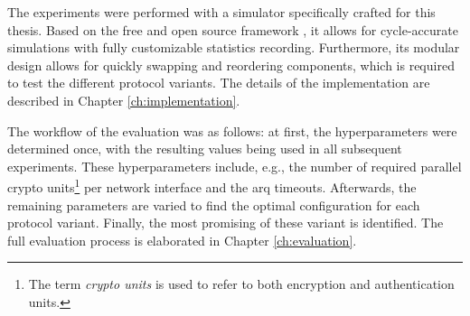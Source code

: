 The experiments were performed with a simulator specifically crafted for this thesis. Based on the free and open source framework \omnet\cite{omnet}, it allows
for cycle-accurate simulations with fully customizable statistics recording. Furthermore, its modular design allows for quickly swapping and
reordering components, which is required to test the different protocol variants. The details of the implementation are described in Chapter
\ref{ch:implementation}.

The workflow of the evaluation was as follows: at first, the hyperparameters were determined once, with the resulting values being used in all
subsequent experiments. These hyperparameters include, e.g., the number of required parallel crypto units\footnote{The term \textit{crypto units} is
used to refer to both encryption and authentication units.} per network interface and the \gls{arq} timeouts. Afterwards, the remaining parameters are
varied to find the optimal configuration for each protocol variant. Finally, the most promising of these variant is identified. The full evaluation
process is elaborated in Chapter \ref{ch:evaluation}. %
